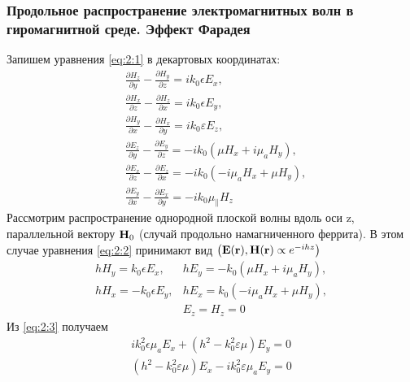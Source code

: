 \subsubsection{Продольное распространение электромагнитных волн в гиромагнитной среде. Эффект Фарадея}
Запишем уравнения \eqref{eq:2:1} в декартовых координатах:
\begin{equation}
    \begin{aligned}
        &\frac{\partial H_{z}}{\partial y}-\frac{\partial H_{y}}{\partial z}=i k_{0} \epsilon E_{x},\\
        &\frac{\partial H_{x}}{\partial z}-\frac{\partial H_{z}}{\partial x}=i k_{0} \epsilon E_{y},\\
        &\frac{\partial H_{y}}{\partial x}-\frac{\partial H_{x}}{\partial y}=i k_{0} \varepsilon E_{z},\\
        &\frac{\partial E_{z}}{\partial y}-\frac{\partial E_{y}}{\partial z}=-i k_{0}\left(\mu H_{x}+i \mu_{a} H_{y}\right),\\
        &\frac{\partial E_{x}}{\partial z}-\frac{\partial E_{z}}{\partial x}=-i k_{0}\left(-i \mu_{a} H_{x}+\mu H_{y}\right),\\
        &\frac{\partial E_{y}}{\partial x}-\frac{\partial E_{x}}{\partial y}=-i k_{0} \mu_{ \|} H_{z}
    \end{aligned}
    \label{eq:2:2}
\end{equation}
Рассмотрим распространение однородной плоской волны вдоль оси z, параллельной вектору $\textbf{H}_0$ (случай продольно
намагниченного феррита). В этом случае уравнения \eqref{eq:2:2} принимают вид $\left(\textbf{E}(\textbf{r}), \textbf{H}(\textbf{r}) \propto e^{-i h
z}\right)$
\begin{equation}
    \begin{array}
    {cl}{h H_{y}=k_{0} \epsilon E_{x},} & {h E_{y}=-k_{0}\left(\mu H_{x}+i \mu_{a} H_{y}\right)}, \\
    {h H_{x}=-k_{0} \epsilon E_{y},} & {h E_{x}=k_{0}\left(-i \mu_{a} H_{x}+\mu H_{y}\right)}, \\
    {} & {E_{z}=H_{z}=0}
    \end{array}
    \label{eq:2:3}
\end{equation}
Из \eqref{eq:2:3} получаем
\begin{equation}
\begin{array}
    {l}{i k_{0}^{2} \epsilon \mu_{a} E_{x}+\left(h^{2}-k_{0}^{2} \varepsilon \mu\right) E_{y}=0} \\
     {\left(h^{2}-k_{0}^{2} \varepsilon \mu\right) E_{x}-i k_{0}^{2} \varepsilon \mu_{a} E_{y}=0}
    \end{array}
    \label{eq:2:4}
\end{equation}
